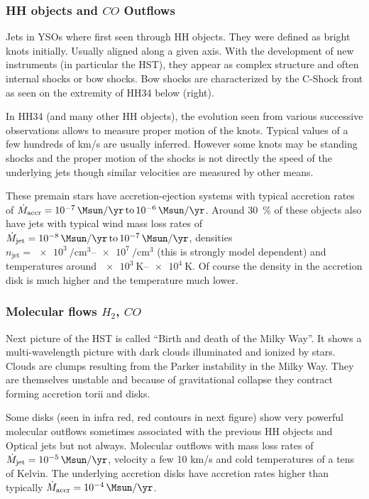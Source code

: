 \documentclass[10pt,a4paper,english]{article}
\newcommand\SIrangeto[2]{\SIrange[range-phrase=\,\text{to}\,]{#1}{#2}}
\begin{document}
\subsubsection{\texorpdfstring{HH objects and $CO$ Outflows}{HH objects and CO Outflows}}

Jets in YSOs where first seen through HH objects. They were defined as bright
knots initially. Usually aligned along a given axis. With the development of
new instruments (in particular the HST), they appear as complex structure and
often internal shocks or bow shocks. Bow shocks are characterized by the
C-Shock front as seen on the extremity of HH34 below (right).

In HH34 (and many other HH objects), the evolution seen from various successive
observations allows to measure proper motion of the knots. Typical values of a
few hundreds of km/s are usually inferred. However some knots may be standing
shocks and the proper motion of the shocks is not directly the speed of the
underlying jets though similar velocities are measured by other means.

These premain stars have accretion-ejection systems with typical accretion
rates of $\dot{M}_\mathrm{accr}=\SIrangeto{e-7}{e-6}{\Msun\per\yr}$. Around
\SI{30}{\percent} of these objects also have jets with typical wind mass loss
rates of $\dot{M}_\mathrm{jet}=\SIrangeto{e-8}{e-7}{\Msun\per\yr}$, densities
$n_\mathrm{jet}=\SIrangeto{e3}{e7}{\per\cubic\cm}$ (this is strongly model dependent)
and temperatures around $\SIrangeto{e3}{e4}{\kelvin}$. Of course the density in
the accretion disk is much higher and the temperature much lower.

\subsubsection{\texorpdfstring{Molecular flows $H_2$, $CO$}{Molecular flows H2, CO}}

Next picture of the HST is called “Birth and death of the Milky Way”. It shows
a multi-wavelength picture with dark clouds illuminated and ionized by stars.
Clouds are clumps resulting from the Parker  instability in the Milky Way. They
are themselves unstable and because of gravitational collapse they contract
forming accretion torii and disks.

Some disks (seen in infra red, red contours in next figure) show very powerful
molecular outflows sometimes associated with the previous HH objects and
Optical jets but not always. Molecular outflows with mass loss rates of
$\dot{M}_\mathrm{jet}=\SI{e-5}{\Msun\per\yr}$, velocity a few 10 km/s and cold
temperatures of a tens of Kelvin. The underlying accretion disks have accretion
rates higher than typically $\dot{M}_\mathrm{accr}=\SI{e-4}{\Msun\per\yr}$.
\end{document}
